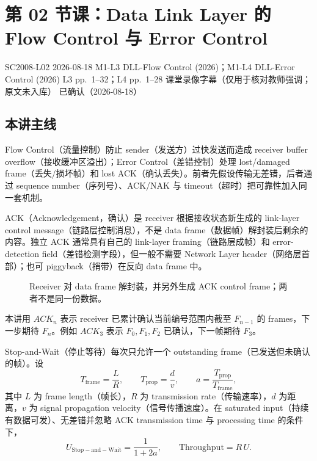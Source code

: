 
\section{第 02 节课：Data Link Layer 的 Flow Control 与 Error Control}
\label{lecture:SC2008-L02}

\lecturemeta
  {SC2008-L02}
  {2026-08-18}
  {M1-L3 DLL-Flow Control (2026)；M1-L4 DLL-Error Control (2026)}
  {L3 pp.~1--32；L4 pp.~1--28}
  {课堂录像字幕（仅用于核对教师强调；原文未入库）}
  {已确认（2026-08-18）}

\subsection{本讲主线}

Flow Control（流量控制）防止 sender（发送方）过快发送而造成 receiver buffer overflow（接收缓冲区溢出）；Error Control（差错控制）处理 lost/damaged frame（丢失/损坏帧）和 lost ACK（确认丢失）。前者先假设传输无差错，后者通过 sequence number（序列号）、ACK/NAK 与 timeout（超时）把可靠性加入同一套机制。


ACK（Acknowledgement，确认）是 receiver 根据接收状态新生成的 link-layer control message（链路层控制消息），不是 data frame（数据帧）解封装后剩余的内容。独立 ACK 通常具有自己的 link-layer framing（链路层成帧）和 error-detection field（差错检测字段），但一般不需要 Network Layer header（网络层首部）；也可 piggyback（捎带）在反向 data frame 中。

\begin{figure}[htbp]
  \centering
  \resizebox{0.92\textwidth}{!}{}
  \caption{Receiver 对 data frame 解封装，并另外生成 ACK control frame；两者不是同一份数据。}
  \label{fig:sc2008-l02-ack-generation}
\end{figure}

本讲用 $ACK_n$ 表示 receiver 已累计确认当前编号范围内截至 $F_{n-1}$ 的 frames，下一步期待 $F_n$。例如 $ACK_3$ 表示 $F_0,F_1,F_2$ 已确认，下一帧期待 $F_3$。


Stop-and-Wait（停止等待）每次只允许一个 outstanding frame（已发送但未确认的帧）。设
\[
  T_{\mathrm{frame}}=\frac{L}{R},\qquad
  T_{\mathrm{prop}}=\frac{d}{v},\qquad
  a=\frac{T_{\mathrm{prop}}}{T_{\mathrm{frame}}},
\]
其中 $L$ 为 frame length（帧长），$R$ 为 transmission rate（传输速率），$d$ 为距离，$v$ 为 signal propagation velocity（信号传播速度）。在 saturated input（持续有数据可发）、无差错并忽略 ACK transmission time 与 processing time 的条件下，
\[
  \boxed{U_{\mathrm{Stop-and-Wait}}=\frac{1}{1+2a}},
  \qquad
  \text{Throughput}=R\,U.
\]

